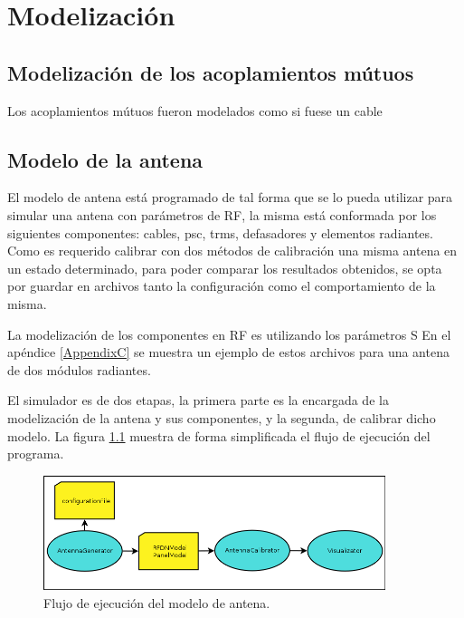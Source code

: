 \chapter{Modelización}
\label{ch:modelizacion}


\section{Modelización de los acoplamientos mútuos}

Los acoplamientos mútuos fueron modelados como si fuese un cable

\section{Modelo de la antena}

El modelo de antena está programado de tal forma que se lo pueda utilizar para simular una antena con parámetros de RF,
la misma está conformada por los siguientes componentes: cables, psc, trms, defasadores y elementos radiantes. Como es 
requerido calibrar con dos métodos de calibración una misma antena en un estado determinado, para poder comparar los resultados
obtenidos, se opta por guardar en archivos tanto la configuración como el comportamiento de la misma. 

La modelizaci\'on de los componentes en RF es utilizando los par\'ametros S 
En el apéndice 
\ref{AppendixC} se muestra un ejemplo de estos archivos para una antena de dos módulos radiantes.

El simulador es de dos etapas, la primera parte es la encargada de la modelización de la antena y sus componentes, y la 
segunda, de calibrar dicho modelo. La figura \ref{fig:prog_inic} muestra de forma simplificada el flujo de ejecuci\'on del 
programa.

\begin{figure}
 \centering
 \includegraphics[width=10cm]{gfx/FlujoEjecucion.png}
 \caption{Flujo de ejecuci\'on del modelo de antena.}
 \label{fig:prog_inic}
\end{figure}

